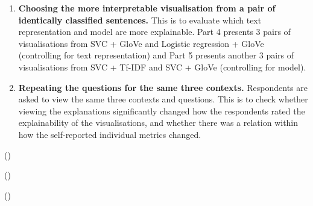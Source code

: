 \begin{enumerate}
	\item \textbf{Choosing the more interpretable visualisation from a pair of identically  classified sentences.} This is to evaluate which text representation and model are more explainable. Part 4 presents 3 pairs of visualisations from SVC + GloVe and Logistic regression + GloVe (controlling for text representation) and Part 5 presents another 3 pairs of visualisations from SVC + Tf-IDF and SVC + GloVe (controlling for model). 
	\item \textbf{Repeating the questions for the same three contexts.} Respondents are asked to view the same three contexts and questions. This is to check whether viewing the explanations significantly changed how the respondents rated the explainability of the visualisations, and whether there was a relation within how the self-reported individual metrics changed.
\end{enumerate}


(\cite{jasper_evaluating_xai})

(\cite{yalcin2022perceptions})

(\cite{francesca_2021})